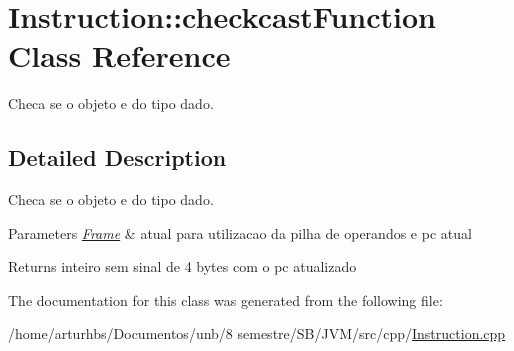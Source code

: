 \hypertarget{classInstruction_1_1checkcastFunction}{}\section{Instruction\+:\+:checkcast\+Function Class Reference}
\label{classInstruction_1_1checkcastFunction}


Checa se o objeto e do tipo dado.  




\subsection{Detailed Description}
Checa se o objeto e do tipo dado. 


\begin{DoxyParams}{Parameters}
{\em \hyperlink{classFrame}{Frame}} & atual para utilizacao da pilha de operandos e pc atual \\
\hline
\end{DoxyParams}
\begin{DoxyReturn}{Returns}
inteiro sem sinal de 4 bytes com o pc atualizado 
\end{DoxyReturn}


The documentation for this class was generated from the following file\+:\begin{DoxyCompactItemize}
\item 
/home/arturhbs/\+Documentos/unb/8 semestre/\+S\+B/\+J\+V\+M/src/cpp/\hyperlink{Instruction_8cpp}{Instruction.\+cpp}\end{DoxyCompactItemize}
